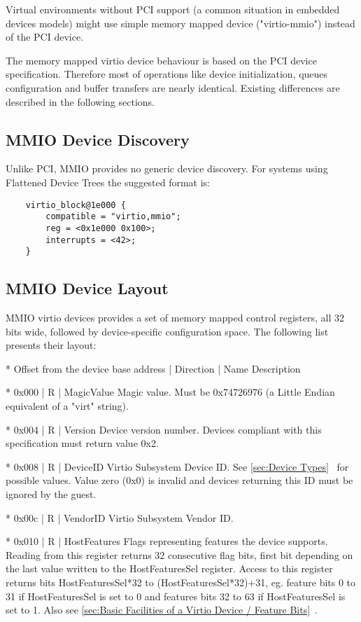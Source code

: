 Virtual environments without PCI support (a common situation in
embedded devices models) might use simple memory mapped device
("virtio-mmio") instead of the PCI device.

The memory mapped virtio device behaviour is based on the PCI
device specification. Therefore most of operations like device
initialization, queues configuration and buffer transfers are
nearly identical. Existing differences are described in the
following sections.

\subsection{MMIO Device Discovery}\label{sec:Virtio Transport Options / Virtio Over MMIO / MMIO Device Discovery}

Unlike PCI, MMIO provides no generic device discovery. For
systems using Flattened Device Trees the suggested format is:

\begin{lstlisting}
	virtio_block@1e000 {
		compatible = "virtio,mmio";
		reg = <0x1e000 0x100>;
		interrupts = <42>;
	}
\end{lstlisting}

\subsection{MMIO Device Layout}\label{sec:Virtio Transport Options / Virtio Over MMIO / MMIO Device Layout}

MMIO virtio devices provides a set of memory mapped control
registers, all 32 bits wide, followed by device-specific
configuration space. The following list presents their layout:

* Offset from the device base address | Direction | Name
  Description

* 0x000 | R | MagicValue
  Magic value. Must be 0x74726976 (a Little Endian equivalent
  of a "virt" string).

* 0x004 | R | Version
  Device version number. Devices compliant with this specification
  must return value 0x2.

* 0x008 | R | DeviceID
  Virtio Subsystem Device ID.
  See \ref{sec:Device Types}~ for possible values. Value zero (0x0)
  is invalid and devices returning this ID must be ignored
  by the guest.

* 0x00c | R | VendorID
  Virtio Subsystem Vendor ID.

* 0x010 | R | HostFeatures
  Flags representing features the device supports.
  Reading from this register returns 32 consecutive flag bits,
  first bit depending on the last value written to the
  HostFeaturesSel register. Access to this register returns
  bits HostFeaturesSel*32 to (HostFeaturesSel*32)+31, eg.
  feature bits 0 to 31 if HostFeaturesSel is set to 0 and
  features bits 32 to 63 if HostFeaturesSel is set to 1.
  Also see \ref{sec:Basic Facilities of a Virtio Device / Feature Bits}~.

